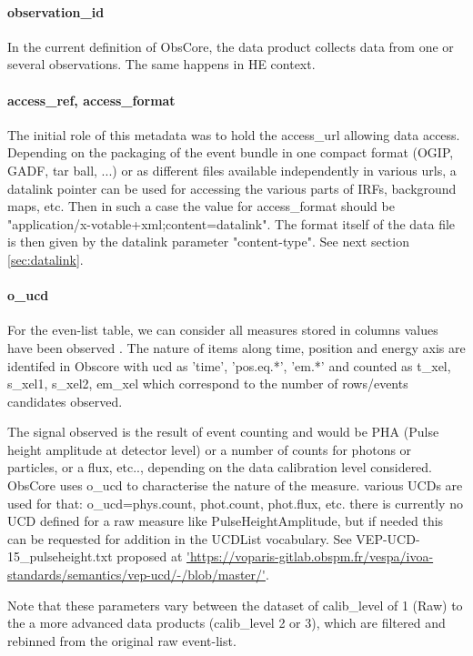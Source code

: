 \documentclass[11pt,a4paper]{ivoa}
\begin{document}
\paragraph{observation\_id}
In the current definition of ObsCore, the data product collects data from one or several observations. The same happens in HE context.

\paragraph{access\_ref, access\_format}
The initial role of this metadata was to hold the access\_url allowing data access.
Depending on the packaging of the event bundle in one compact format (OGIP, GADF, tar ball, ...)
or as different files available independently in various urls, a datalink pointer can be used for accessing the various parts of IRFs, background maps, etc.
Then in such a case the value for access\_format should be "application/x-votable+xml;content=datalink". The format itself of the data file is then given by the datalink parameter "content-type".
See next section \ref{sec:datalink}.

\paragraph{o\_ucd}
For the even-list table, we can consider all measures stored in columns values have been observed .
The nature of items along time, position and energy axis are identifed in Obscore with ucd as 'time', 'pos.eq.*', 'em.*'
and counted as t\_xel, s\_xel1, s\_xel2, em\_xel which correspond to the number of rows/events candidates observed.

The signal observed is the result of event counting and would be PHA (Pulse height amplitude at detector level) or a number of counts for photons or particles, or a flux, etc.., depending on the data calibration level considered.
ObsCore uses o\_ucd to characterise the nature of the measure.
various UCDs are used for that: o\_ucd=phys.count, phot.count, phot.flux, etc. there is currently no UCD defined for a raw measure like PulseHeightAmplitude, but if needed this can be requested for addition in the UCDList vocabulary. See VEP-UCD-15\_pulseheight.txt proposed at \url{'https://voparis-gitlab.obspm.fr/vespa/ivoa-standards/semantics/vep-ucd/-/blob/master/'}.

Note that these parameters vary between the dataset of calib\_level of 1 (Raw) to the a more advanced data products (calib\_level 2 or 3), which are filtered and rebinned from the original raw event-list.
\end{document}
